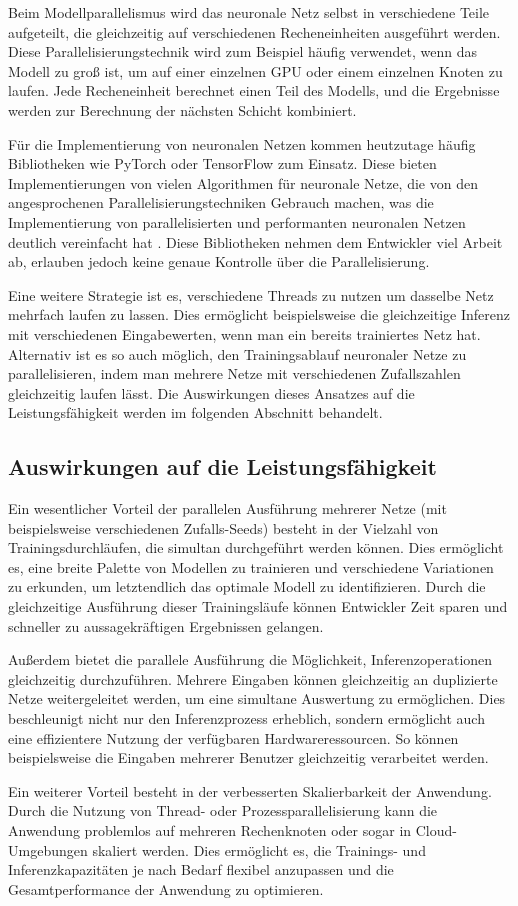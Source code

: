 Beim Modellparallelismus wird das neuronale Netz selbst in verschiedene Teile aufgeteilt, die gleichzeitig auf verschiedenen Recheneinheiten ausgeführt werden. Diese Parallelisierungstechnik wird zum Beispiel häufig verwendet, wenn das Modell zu groß ist, um auf einer einzelnen GPU oder einem einzelnen Knoten zu laufen. Jede Recheneinheit berechnet einen Teil des Modells, und die Ergebnisse werden zur Berechnung der nächsten Schicht kombiniert.

Für die Implementierung von neuronalen Netzen kommen heutzutage häufig Bibliotheken wie PyTorch oder TensorFlow zum Einsatz. Diese bieten Implementierungen von vielen Algorithmen für neuronale Netze, die von den angesprochenen Parallelisierungstechniken Gebrauch machen, was die Implementierung von parallelisierten und performanten neuronalen Netzen deutlich vereinfacht hat \citep{pytorch_advances_in_neural_systems}.
Diese Bibliotheken nehmen dem Entwickler viel Arbeit ab, erlauben jedoch keine genaue Kontrolle über die Parallelisierung.

Eine weitere Strategie ist es, verschiedene Threads zu nutzen um dasselbe Netz mehrfach laufen zu lassen. Dies ermöglicht beispielsweise die gleichzeitige Inferenz mit verschiedenen Eingabewerten, wenn man ein bereits trainiertes Netz hat. Alternativ ist es so auch möglich, den Trainingsablauf neuronaler Netze zu parallelisieren, indem man mehrere Netze mit verschiedenen Zufallszahlen gleichzeitig laufen lässt. Die Auswirkungen dieses Ansatzes auf die Leistungsfähigkeit werden im folgenden Abschnitt behandelt.

\subsection{Auswirkungen auf die Leistungsfähigkeit}
\label{sec:Grundlagen_Parallelisierung_Leistungsfähigkeit}

Ein wesentlicher Vorteil der parallelen Ausführung mehrerer Netze (mit beispielsweise verschiedenen Zufalls-Seeds) besteht in der Vielzahl von Trainingsdurchläufen, die simultan durchgeführt werden können. Dies ermöglicht es, eine breite Palette von Modellen zu trainieren und verschiedene Variationen zu erkunden, um letztendlich das optimale Modell zu identifizieren. Durch die gleichzeitige Ausführung dieser Trainingsläufe können Entwickler Zeit sparen und schneller zu aussagekräftigen Ergebnissen gelangen.

Außerdem bietet die parallele Ausführung die Möglichkeit, Inferenzoperationen gleichzeitig durchzuführen. Mehrere Eingaben können gleichzeitig an duplizierte Netze weitergeleitet werden, um eine simultane Auswertung zu ermöglichen. Dies beschleunigt nicht nur den Inferenzprozess erheblich, sondern ermöglicht auch eine effizientere Nutzung der verfügbaren Hardwareressourcen. So können beispielsweise die Eingaben mehrerer Benutzer gleichzeitig verarbeitet werden.

Ein weiterer Vorteil besteht in der verbesserten Skalierbarkeit der Anwendung. Durch die Nutzung von Thread- oder Prozessparallelisierung kann die Anwendung problemlos auf mehreren Rechenknoten oder sogar in Cloud-Umgebungen skaliert werden. Dies ermöglicht es, die Trainings- und Inferenzkapazitäten je nach Bedarf flexibel anzupassen und die Gesamtperformance der Anwendung zu optimieren.
